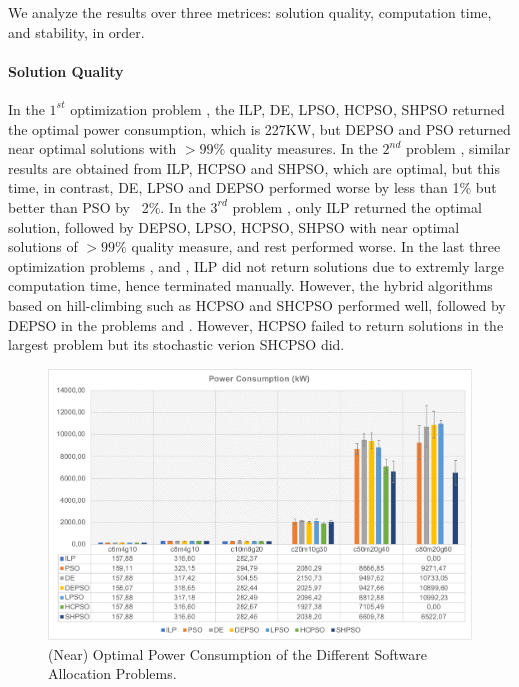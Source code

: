 We analyze the results over three metrices: solution quality, computation time, and stability, in order.

\paragraph{Solution Quality} In the $1^{st}$ optimization problem  , the ILP, DE, LPSO, HCPSO, SHPSO returned the optimal power consumption, which is 227KW, but DEPSO and PSO returned near optimal solutions with $>99\%$ quality measures. In the $2^{nd}$ problem  , similar results are obtained from ILP, HCPSO and SHPSO, which are optimal, but this time, in contrast, DE, LPSO and DEPSO performed worse by less than 1\% but better than PSO by ~2\%.  In the $3^{rd}$ problem , only ILP returned the optimal solution, followed by DEPSO, LPSO, HCPSO, SHPSO with near optimal solutions of $>99\%$ quality measure, and rest performed worse. In the last three optimization problems ,  and  , ILP did not return solutions due to extremly large computation time, hence terminated manually. However, the hybrid algorithms based on hill-climbing such as HCPSO and SHCPSO performed well, followed by DEPSO in the problems  and  . However, HCPSO failed to return solutions in the largest problem  but its stochastic verion SHCPSO did.
\begin{figure}
\centering
\includegraphics[width=1\linewidth]{img/power_consumption.pdf}
\caption{(Near) Optimal Power Consumption of the Different Software Allocation Problems.}
\label{fig_powerconsumption_ilp_metaheuristic}\vspace{-0.4cm}
\end{figure}

